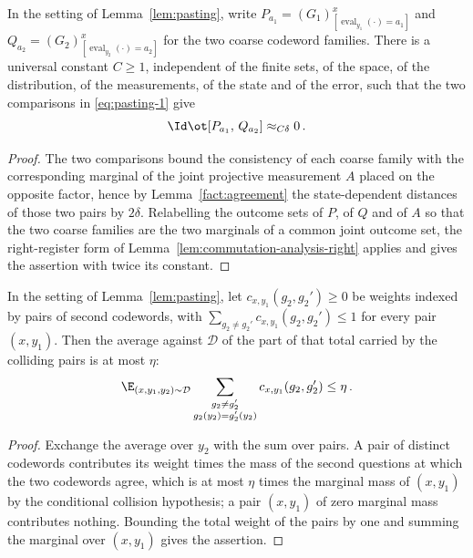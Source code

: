 \begin{lemma}
	\label{lem:pasting-coarse-commutator}
	\leanok
	In the setting of Lemma~\ref{lem:pasting}, write
	$P_{a_1} = (G_1)^x_{[\operatorname{eval}_{y_1}(\cdot)=a_1]}$ and
	$Q_{a_2} = (G_2)^x_{[\operatorname{eval}_{y_2}(\cdot)=a_2]}$ for the two
	coarse codeword families. There is a universal constant $C \ge 1$,
	independent of the finite sets, of the space, of the distribution, of the
	measurements, of the state and of the error, such that the two comparisons
	in \eqref{eq:pasting-1} give
	\[
		\Id \ot [P_{a_1},\, Q_{a_2}] \approx_{C \delta} 0\,.
	\]
\end{lemma}
\begin{proof}
	\leanok
	The two comparisons bound the consistency of each coarse family with the
	corresponding marginal of the joint projective measurement $A$ placed on the
	opposite factor, hence by Lemma~\ref{fact:agreement} the state-dependent
	distances of those two pairs by $2\delta$. Relabelling the outcome sets of
	$P$, of $Q$ and of $A$ so that the two coarse families are the two marginals
	of a common joint outcome set, the right-register form of
	Lemma~\ref{lem:commutation-analysis-right} applies and gives the assertion with
	twice its constant.
\end{proof}

\begin{lemma}
	\label{lem:pasting-collision-averaging}
	\leanok
	In the setting of Lemma~\ref{lem:pasting}, let
	$c_{x,y_1}(g_2, g_2') \ge 0$ be weights indexed by pairs of second
	codewords, with $\sum_{g_2 \ne g_2'} c_{x,y_1}(g_2, g_2') \le 1$ for every
	pair $(x, y_1)$. Then the average against $\mathcal D$ of the part of that
	total carried by the colliding pairs is at most $\eta$:
	\[
		\E_{(x,y_1,y_2) \sim \mathcal D}
			\sum_{\substack{g_2 \ne g_2' \\ g_2(y_2) = g_2'(y_2)}}
				c_{x,y_1}(g_2, g_2') \le \eta\,.
	\]
\end{lemma}
\begin{proof}
	\leanok
	Exchange the average over $y_2$ with the sum over pairs. A pair of distinct
	codewords contributes its weight times the mass of the second questions at
	which the two codewords agree, which is at most $\eta$ times the marginal
	mass of $(x, y_1)$ by the conditional collision hypothesis; a pair
	$(x, y_1)$ of zero marginal mass contributes nothing. Bounding the total
	weight of the pairs by one and summing the marginal over $(x, y_1)$ gives
	the assertion.
\end{proof}

